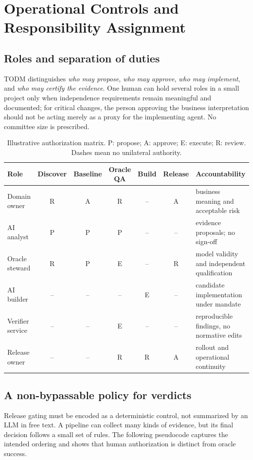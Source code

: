 \documentclass[11pt,a4paper]{article}
\begin{document}
\section{Operational Controls and Responsibility Assignment}
\subsection{Roles and separation of duties}
TODM distinguishes \emph{who may propose}, \emph{who may approve}, \emph{who may implement}, and \emph{who may certify the evidence}. One human can hold several roles in a small project only when independence requirements remain meaningful and documented; for critical changes, the person approving the business interpretation should not be acting merely as a proxy for the implementing agent. No committee size is prescribed.

\begin{table}[htbp]
\centering\footnotesize
\caption{Illustrative authorization matrix. P: propose; A: approve; E: execute; R: review. Dashes mean no unilateral authority.}
\begin{tabularx}{\linewidth}{@{}p{28mm}cccccX@{}}
\toprule
Role & Discover & Baseline & Oracle QA & Build & Release & Accountability \\
\midrule
Domain owner & R & A & R & -- & A & business meaning and acceptable risk \\
AI analyst & P & P & P & -- & -- & evidence proposals; no sign-off \\
Oracle steward & R & P & E & -- & R & model validity and independent qualification \\
AI builder & -- & -- & -- & E & -- & candidate implementation under mandate \\
Verifier service & -- & -- & E & -- & -- & reproducible findings, no normative edits \\
Release owner & -- & -- & R & R & A & rollout and operational continuity \\
\bottomrule
\end{tabularx}
\label{tab:roles}
\end{table}

\subsection{A non-bypassable policy for verdicts}
Release gating must be encoded as a deterministic control, not summarized by an LLM in free text. A pipeline can collect many kinds of evidence, but its final decision follows a small set of rules. The following pseudocode captures the intended ordering and shows that human authorization is distinct from oracle success.
\end{document}
